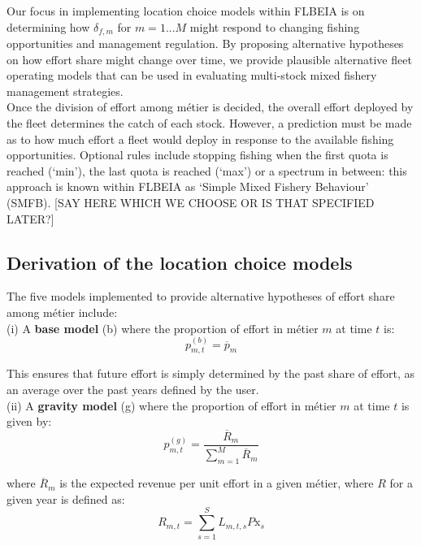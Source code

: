 \documentclass[12pt, halfline, a4paper]{ouparticle}
\begin{document}
Our focus in implementing location choice models within FLBEIA is on
determining how $\delta_{f,m}$ for $m=1...M$ might respond to changing fishing
opportunities and management regulation. By proposing alternative hypotheses on how
effort share might change over time, we provide plausible alternative fleet
operating models that can be used in evaluating multi-stock mixed fishery management strategies.
\\

Once the division of effort among métier is decided, the overall effort deployed
by the fleet determines the catch of each stock. However, a prediction must be
made as to how much effort a fleet would deploy in response to the available
fishing opportunities. Optional rules include stopping fishing when the first
quota is reached (`min'), the last quota is reached (`max') or a spectrum in
between: this approach is known within FLBEIA as `Simple Mixed Fishery
Behaviour' (SMFB). [SAY HERE WHICH WE CHOOSE OR IS THAT SPECIFIED LATER?]

\subsection{Derivation of the location choice models}

The five models implemented to provide alternative hypotheses of effort share
among métier include:\\

(i) A \textbf{base model} (b) where the proportion of effort in métier $m$ at time
$t$ is:
\begin{equation}
p^{(b)}_{m,t} = \overline{p}_{m}
\end{equation}

This ensures that future effort is simply determined by the past share of
effort, as an average over the past years defined by the user. \\

(ii) A \textbf{gravity model} (g) where the proportion of effort in métier $m$ at
time $t$ is given by: 
\begin{equation}
p^{(g)}_{m,t} = \frac{\overline{R}_{m}}{\sum\limits_{m=1}^{M}\overline{R}_{m}} 
\end{equation}

where $\overline{R}_m$ is the expected revenue per unit effort in a given
métier, where $R$ for a given year is defined as: 
\begin{equation}
R_{m,t} =  \sum\limits_{s=1}^{S} L_{m,t,s} P\text{x}_{s} 
\label{eqn:ppue}
\end{equation}
\end{document}
